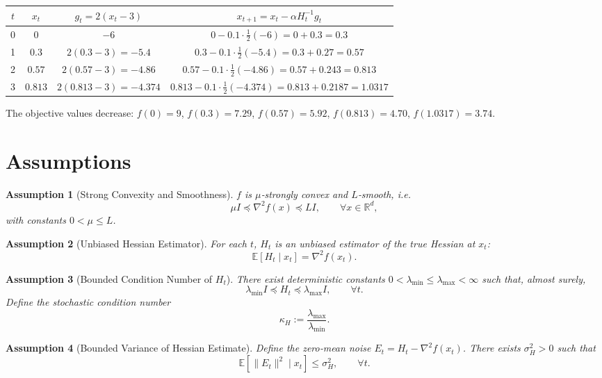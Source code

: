 \documentclass[11pt]{article}
\newtheorem{assumption}{Assumption}
\newcommand{\E}{\mathbb{E}}
\begin{document}
\begin{center}
\begin{tabular}{c|c|c|c}
$t$ & $x_{t}$ & $g_{t}=2(x_{t}-3)$ & $x_{t+1}=x_{t}-\alpha H_{t}^{-1}g_{t}$ \\ \hline
0 & $0$ & $-6$ & $0-0.1\cdot\frac{1}{2}(-6)=0+0.3=0.3$ \\
1 & $0.3$ & $2(0.3-3)=-5.4$ & $0.3-0.1\cdot\frac{1}{2}(-5.4)=0.3+0.27=0.57$ \\
2 & $0.57$ & $2(0.57-3)=-4.86$ & $0.57-0.1\cdot\frac{1}{2}(-4.86)=0.57+0.243=0.813$ \\
3 & $0.813$ & $2(0.813-3)=-4.374$ & $0.813-0.1\cdot\frac{1}{2}(-4.374)=0.813+0.2187=1.0317$
\end{tabular}
\end{center}
The objective values decrease:
$f(0)=9$, $f(0.3)=7.29$, $f(0.57)=5.92$, $f(0.813)=4.70$, $f(1.0317)=3.74$.

\newpage
\section*{Assumptions}
\begin{assumption}[Strong Convexity and Smoothness]\label{ass:strong}
$f$ is $\mu$‑strongly convex and $L$‑smooth, i.e.
\[
\mu I \preceq \nabla^{2}f(x) \preceq L I,\qquad\forall x\in\mathbb{R}^{d},
\]
with constants $0<\mu\le L$.
\end{assumption}

\begin{assumption}[Unbiased Hessian Estimator]\label{ass:unbiased}
For each $t$, $H_{t}$ is an unbiased estimator of the true Hessian at $x_{t}$:
\[
\E[H_{t}\mid x_{t}]=\nabla^{2}f(x_{t}).
\]
\end{assumption}

\begin{assumption}[Bounded Condition Number of $H_{t}$]\label{ass:cond}
There exist deterministic constants $0<\lambda_{\min}\le \lambda_{\max}<\infty$ such that, almost surely,
\[
\lambda_{\min} I \preceq H_{t}\preceq \lambda_{\max} I,\qquad\forall t.
\]
Define the stochastic condition number
\[
\kappa_{H}:=\frac{\lambda_{\max}}{\lambda_{\min}}.
\]
\end{assumption}

\begin{assumption}[Bounded Variance of Hessian Estimate]\label{ass:var}
Define the zero‑mean noise $E_{t}=H_{t}-\nabla^{2}f(x_{t})$. There exists $\sigma_{H}^{2}>0$ such that
\[
\E[\|E_{t}\|^{2}\mid x_{t}]\le \sigma_{H}^{2},\qquad\forall t.
\]
\end{assumption}
\end{document}
